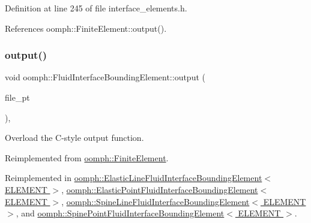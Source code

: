 Definition at line 245 of file interface\+\_\+elements.\+h.



References oomph\+::\+Finite\+Element\+::output().

\mbox{\label{classoomph_1_1FluidInterfaceBoundingElement_a85cc62405429744e3e3585894315cb9e}} 
\subsubsection{\texorpdfstring{output()}{output()}\hspace{0.1cm}{\footnotesize\ttfamily [3/4]}}
{\footnotesize\ttfamily void oomph\+::\+Fluid\+Interface\+Bounding\+Element\+::output (\begin{DoxyParamCaption}\item[{F\+I\+LE $\ast$}]{file\+\_\+pt }\end{DoxyParamCaption})\hspace{0.3cm}{\ttfamily [inline]}, {\ttfamily [virtual]}}



Overload the C-\/style output function. 



Reimplemented from \hyperlink{classoomph_1_1FiniteElement_a72cddd09f8ddbee1a20a1ff404c6943e}{oomph\+::\+Finite\+Element}.



Reimplemented in \hyperlink{classoomph_1_1ElasticLineFluidInterfaceBoundingElement_a0979784b94ab8285a964ab14077b8320}{oomph\+::\+Elastic\+Line\+Fluid\+Interface\+Bounding\+Element$<$ E\+L\+E\+M\+E\+N\+T $>$}, \hyperlink{classoomph_1_1ElasticPointFluidInterfaceBoundingElement_a61782633205934c9af1aead51640e220}{oomph\+::\+Elastic\+Point\+Fluid\+Interface\+Bounding\+Element$<$ E\+L\+E\+M\+E\+N\+T $>$}, \hyperlink{classoomph_1_1SpineLineFluidInterfaceBoundingElement_ab34fbdcd7785ab6a731a3b5d50896829}{oomph\+::\+Spine\+Line\+Fluid\+Interface\+Bounding\+Element$<$ E\+L\+E\+M\+E\+N\+T $>$}, and \hyperlink{classoomph_1_1SpinePointFluidInterfaceBoundingElement_a2435b4b786ede183808834b4d0c5210c}{oomph\+::\+Spine\+Point\+Fluid\+Interface\+Bounding\+Element$<$ E\+L\+E\+M\+E\+N\+T $>$}.



